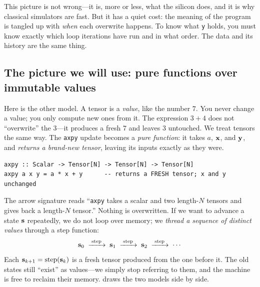 This picture is not wrong---it is, more or less, what the silicon does, and it is
why classical simulators are fast. But it has a quiet cost: the meaning of the
program is tangled up with \emph{when} each overwrite happens. To know what
\texttt{y} holds, you must know exactly which loop iterations have run and in what
order. The data and its history are the same thing.

\subsection{The picture we will use: pure functions over immutable values}

Here is the other model. A tensor is a \emph{value}, like the number $7$. You
never change a value; you only compute new ones from it. The expression $3 + 4$
does not ``overwrite'' the $3$---it produces a fresh $7$ and leaves $3$ untouched.
We treat tensors the same way. The \texttt{axpy} update becomes a \emph{pure
function}: it takes $a$, $\mathbf{x}$, and $\mathbf{y}$, and \emph{returns a brand-new tensor},
leaving its inputs exactly as they were.

\begin{lstlisting}[style=l4style]
axpy :: Scalar -> Tensor[N] -> Tensor[N] -> Tensor[N]
axpy a x y = a * x + y      -- returns a FRESH tensor; x and y unchanged
\end{lstlisting}

\noindent The arrow signature reads ``\texttt{axpy} takes a scalar and two
length-$N$ tensors and gives back a length-$N$ tensor.'' Nothing is overwritten.
If we want to advance a state $\mathbf{s}$ repeatedly, we do not loop over memory; we
\emph{thread a sequence of distinct values} through a step function:
\[
  \mathbf{s}_0 \;\xrightarrow{\;\mathrm{step}\;}\; \mathbf{s}_1
        \;\xrightarrow{\;\mathrm{step}\;}\; \mathbf{s}_2
        \;\xrightarrow{\;\mathrm{step}\;}\; \cdots
\]
Each $\mathbf{s}_{k+1} = \mathrm{step}(\mathbf{s}_k)$ is a fresh tensor produced from the one
before it. The old states still ``exist'' as values---we simply stop referring to
them, and the machine is free to reclaim their memory. 
draws the two models side by side.

